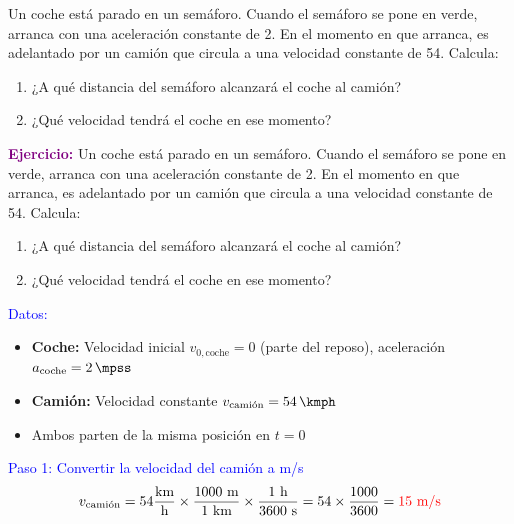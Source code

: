 \begin{exercise}
    Un coche está parado en un semáforo.
    Cuando el semáforo se pone en verde, arranca con una aceleración constante de \qty{2}{\mpss}.
    En el momento en que arranca, es adelantado por un camión que circula a una velocidad constante de \qty{54}{\kmph}.
    Calcula:

    \begin{enumerate}[label=\letraminuscula]
    \item ¿A qué distancia del semáforo alcanzará el coche al camión?
    \item ¿Qué velocidad tendrá el coche en ese momento?
    \end{enumerate}
    \begin{solu}
        \textbf{\textcolor{purple}{Ejercicio:}} Un coche está parado en un semáforo.
        Cuando el semáforo se pone en verde, arranca con una aceleración constante de \qty{2}{\mpss}.
        En el momento en que arranca, es adelantado por un camión que circula a una velocidad constante de \qty{54}{\kmph}.
        Calcula:

        \begin{enumerate}[label=\letraminuscula]
    \item ¿A qué distancia del semáforo alcanzará el coche al camión?
    \item ¿Qué velocidad tendrá el coche en ese momento?
        \end{enumerate}

        \vspace{0.3cm}

        \textcolor{blue}{Datos:}
        \begin{itemize}
            \item \textbf{Coche:} Velocidad inicial $v_{0,\text{coche}} = 0$ (parte del reposo), aceleración $a_{\text{coche}} = \qty{2}{\mpss}$
            \item \textbf{Camión:} Velocidad constante $v_{\text{camión}} = \qty{54}{\kmph}$
            \item Ambos parten de la misma posición en $t = 0$
        \end{itemize}

        \textcolor{blue}{Paso 1: Convertir la velocidad del camión a m/s}
        \[
            v_{\text{camión}} = 54 \frac{\text{km}}{\text{h}} \times \frac{1000 \text{ m}}{1 \text{ km}} \times \frac{1 \text{ h}}{3600 \text{ s}} = 54 \times \frac{1000}{3600} = \textcolor{red}{15 \text{ m/s}}
        \]


\end{solu}
\end{exercise}
